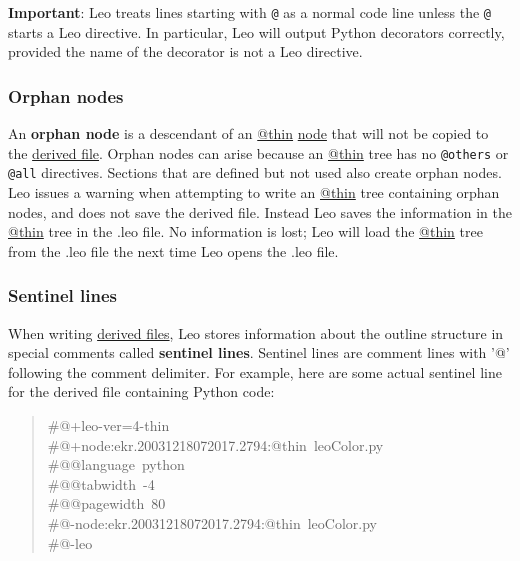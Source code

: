 \documentclass[10pt,a4paper,english]{article}
\begin{document}
\textbf{Important}:
Leo treats lines starting with \texttt{@} as a normal code line unless the \texttt{@} starts a Leo directive.
In particular, Leo will output Python decorators correctly, provided the name of the decorator is not a Leo directive.



\hypertarget{orphan-nodes}{}
\subsubsection*{Orphan nodes}

An \textbf{orphan node} is a descendant of an \href{glossary.html\#thin}{@thin} \href{glossary.html\#node}{node} that will not be copied
to the \href{\#derived-files}{derived file}. Orphan nodes can arise because an \href{glossary.html\#thin}{@thin} tree has no
\texttt{@others} or \texttt{@all} directives. Sections that are defined but not used also
create orphan nodes. Leo issues a warning when attempting to write an \href{glossary.html\#thin}{@thin}
tree containing orphan nodes, and does not save the derived file. Instead Leo
saves the information in the \href{glossary.html\#thin}{@thin} tree in the .leo file. No information is
lost; Leo will load the \href{glossary.html\#thin}{@thin} tree from the .leo file the next time Leo
opens the .leo file.



\hypertarget{sentinel-lines}{}
\subsubsection*{Sentinel lines}

When writing \href{\#derived-files}{derived files}, Leo stores information about the outline
structure in special comments called \textbf{sentinel lines}. Sentinel lines are
comment lines with '@' following the comment delimiter. For example, here are
some actual sentinel line for the derived file containing Python code:
\begin{quote}{\ttfamily \raggedright \noindent
{\#}@+leo-ver=4-thin~\\
{\#}@+node:ekr.20031218072017.2794:@thin~leoColor.py~\\
{\#}@@language~python~\\
{\#}@@tabwidth~-4~\\
{\#}@@pagewidth~80~\\
{\#}@-node:ekr.20031218072017.2794:@thin~leoColor.py~\\
{\#}@-leo
}\end{quote}
\end{document}
